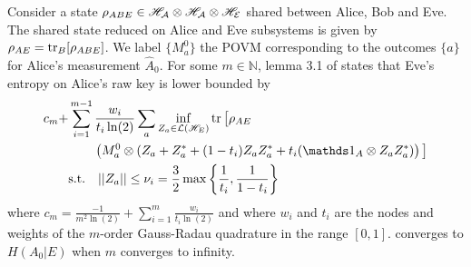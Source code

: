 Consider a state $\rho_{ABE} \in \mathcal{\mathscr{H}_A} \otimes \mathcal{\mathscr{H}_A} \otimes \mathcal{\mathscr{H}_E} $ shared between Alice, Bob and Eve. 
The shared state reduced on Alice and Eve subsystems is given by $\rho_{AE}=\tr_B[\rho_{ABE}]$.
We label $\{M_a^0\}$ the POVM corresponding to the outcomes $\{a\}$ for Alice's measurement $\hat{A}_0$.
For some $m\in\mathds{N}$, lemma 3.1 of \cite{Brown2021} states that Eve's entropy on Alice's raw key is lower bounded by
\begin{equation}
	\begin{split}
		c_m + &\sum_{i=1}^{m-1}\frac{w_i}{t_i\ln(2)}\sum_a \inf_{Z_a\in \mathcal{L}(\Hil_E)} \tr\big[\rho_{AE} \\
			  &\qquad\left(M_a^0 \otimes (Z_a + Z_a^* + (1-t_i)Z_aZ_a^*+t_i(\id_A\otimes Z_a Z_a^*)\right)\big] \\
			  &\text{s.t.} \quad ||Z_a|| \leq \nu_i = \frac{3}{2}\max\left\{\frac{1}{t_i},\frac{1}{1-t_i}\right\}
	\end{split}
	\label{eq:Brown}
\end{equation}
where $c_m=\frac{-1}{m^2 \ln(2)}+\sum_{i=1}^m \frac{w_i}{t_i \ln(2)}$ and where $w_i$ and $t_i$ are the nodes and weights of the $m$-order Gauss-Radau quadrature in the range $[0,1]$.
 converges to $H(A_0|E)$ when $m$ converges to infinity.

